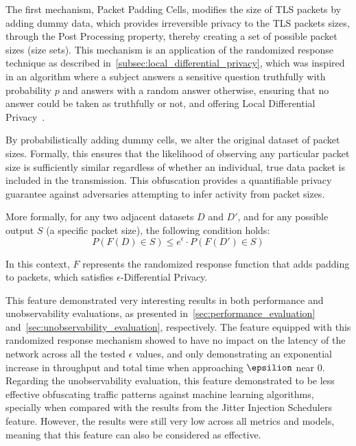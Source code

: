 The first mechanism, Packet Padding Cells, modifies the size of TLS packets by adding dummy data, which provides irreversible privacy to the TLS packets sizes, through the Post Processing property, thereby creating a set of possible packet sizes (size sets).
This mechanism is an application of the randomized response technique as described in~\autoref{subsec:local_differential_privacy}, which was inspired in an algorithm where a subject answers a sensitive question truthfully with probability $p$ and answers with a random answer otherwise, ensuring that no answer could be taken as truthfully or not, and offering Local Differential Privacy~\cite{RandomizedResponse, AlgFoundationsDP}.

By probabilistically adding dummy cells, we alter the original dataset of packet sizes. Formally, this ensures that the likelihood of observing any particular packet size is sufficiently similar regardless of whether an individual, true data packet is included in the transmission. This obfuscation provides a quantifiable privacy guarantee against adversaries attempting to infer activity from packet sizes.

More formally, for any two adjacent datasets $D$ and $D'$, and for any possible output $S$ (a specific packet size), the following condition holds:
\[P(F(D) \in S) \leq e^{\epsilon} \cdot P(F(D') \in S)\]

In this context, $F$ represents the randomized response function that adds padding to packets, which satisfies $\epsilon$-Differential Privacy. 

This feature demonstrated very interesting results in both performance and unobservability evaluations, as presented in~\autoref{sec:performance_evaluation} and~\autoref{sec:unobservability_evaluation}, respectively. The feature equipped with this randomized response mechanism showed to have no impact on the latency of the network across all the tested $\epsilon$ values, and only demonstrating an exponential increase in throughput and total time when approaching $\epsilion$ near 0. Regarding the unobservability evaluation, this feature demonstrated to be less effective obfuscating traffic patterns against machine learning algorithms, specially when compared with the results from the Jitter Injection Schedulers feature. However, the results were still very low across all metrics and models, meaning that this feature can also be considered as effective.

